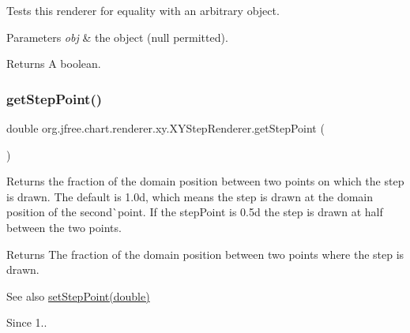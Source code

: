 Tests this renderer for equality with an arbitrary object.


\begin{DoxyParams}{Parameters}
{\em obj} & the object ({\ttfamily null} permitted).\\
\hline
\end{DoxyParams}
\begin{DoxyReturn}{Returns}
A boolean. 
\end{DoxyReturn}
\mbox{\label{classorg_1_1jfree_1_1chart_1_1renderer_1_1xy_1_1_x_y_step_renderer_a4e528d2e25bd9b196bc6613432792fe7}} 
\subsubsection{\texorpdfstring{get\+Step\+Point()}{getStepPoint()}}
{\footnotesize\ttfamily double org.\+jfree.\+chart.\+renderer.\+xy.\+X\+Y\+Step\+Renderer.\+get\+Step\+Point (\begin{DoxyParamCaption}{ }\end{DoxyParamCaption})}

Returns the fraction of the domain position between two points on which the step is drawn. The default is 1.\+0d, which means the step is drawn at the domain position of the second\`{}point. If the step\+Point is 0.\+5d the step is drawn at half between the two points.

\begin{DoxyReturn}{Returns}
The fraction of the domain position between two points where the step is drawn.
\end{DoxyReturn}
\begin{DoxySeeAlso}{See also}
\mbox{\hyperlink{classorg_1_1jfree_1_1chart_1_1renderer_1_1xy_1_1_x_y_step_renderer_a657a476c2702d644c93e754f73e5732a}{set\+Step\+Point(double)}}
\end{DoxySeeAlso}
\begin{DoxySince}{Since}
1.. 
\end{DoxySince}
\mbox{\label{classorg_1_1jfree_1_1chart_1_1renderer_1_1xy_1_1_x_y_step_renderer_a5a1ec9cd08cbf2f6ba478feaec34e63f}} 
